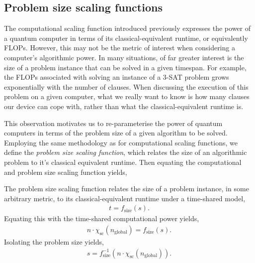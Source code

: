 %
%

\subsection{Problem size scaling functions}\label{sec:prob_sc_func}

The computational scaling function introduced previously expresses the power of a quantum computer in terms of its classical-equivalent runtime, or equivalently FLOPs. However, this may not be the metric of interest when considering a computer's algorithmic power. In many situations, of far greater interest is the size of a problem instance that can be solved in a given timespan. For example, the FLOPs associated with solving an instance of a 3-\textsc{SAT} problem grows exponentially with the number of clauses. When discussing the execution of this problem on a given computer, what we really want to know is how many clauses our device can cope with, rather than what the classical-equivalent runtime is.

This observation motivates us to re-parameterise the power of quantum computers in terms of the problem size of a given algorithm to be solved. Employing the same methodology as for computational scaling functions, we define the \textit{problem size scaling function}, which relates the size of an algorithmic problem to it's classical equivalent runtime. Then equating the computational and problem size scaling function yields,

\begin{definition}
The problem size scaling function relates the size of a problem instance, in some arbitrary metric, to its classical-equivalent runtime under a time-shared model,
\begin{align}
t = f_\text{size}(s).
\end{align}
Equating this with the time-shared computational power yields,
\begin{align}
	n\cdot \chi_\text{sc}(n_\text{global}) = f_\text{size}(s).
\end{align}
Isolating the problem size yields,
\begin{align}
s = f_\text{size}^{-1}(n\cdot \chi_\text{sc}(n_\text{global})).
\end{align}
\end{definition}

